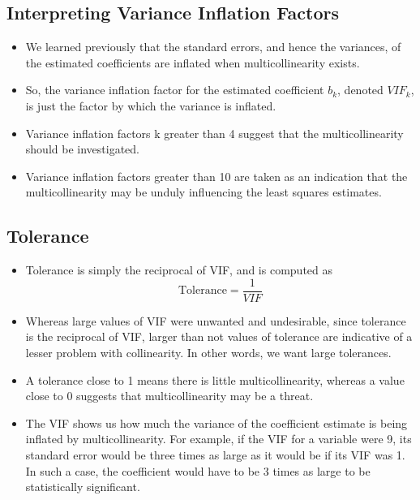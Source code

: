 \documentclass[a4paper,12pt]{article}
\begin{document}
	\subsection{Interpreting Variance Inflation Factors}
	
	
\begin{itemize}
\item 	We learned previously that the standard errors, and hence the variances, of 
	the estimated coefficients are inflated when multicollinearity exists. 
\item 	So, the variance inflation factor for the estimated coefficient $b_k$, denoted $VIF_k$, 
	is just the factor by which the variance is inflated. 
	
\item 	Variance inflation factors k greater than 4 suggest that the multicollinearity should be investigated. 
\item 	Variance inflation factors greater than 10 are taken as an indication that the multicollinearity may be unduly influencing the least squares estimates. 
\end{itemize}	

	
	


\subsection{Tolerance}
\begin{itemize}
\item Tolerance is simply the reciprocal of VIF, and is computed as
\[ \mbox{Tolerance} = \frac{1}{VIF}\]
\item Whereas large values of VIF were unwanted and undesirable, since tolerance is the reciprocal of VIF, larger than not values of tolerance are indicative of a lesser problem with collinearity. In other words, we want large tolerances.
\item 	A tolerance close to 1 means there is little multicollinearity, whereas a value close to 0 suggests that multicollinearity may be a threat. 


\item The VIF shows us how much the variance of the coefficient estimate is being inflated by multicollinearity. For example, if the VIF for a variable were 9, its standard error would be three times as large as it would be if its VIF was 1. In such a case, the coefficient would have to be 3 times as large to be statistically significant.


\end{itemize}
\end{document}
